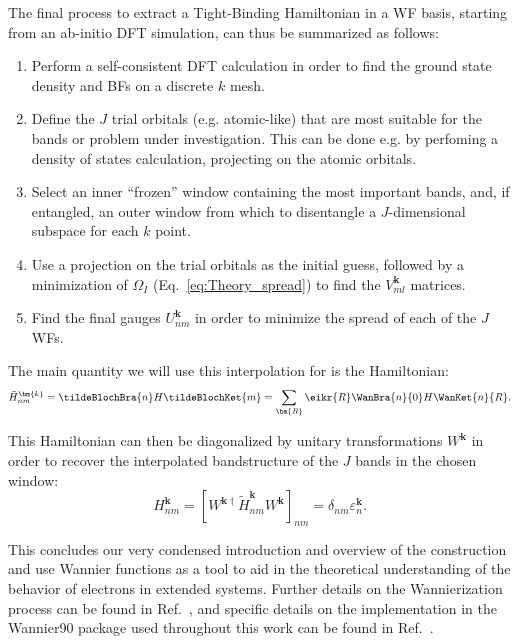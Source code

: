 The final process to extract a Tight-Binding Hamiltonian in a WF basis, starting from an ab-initio DFT simulation, can thus be summarized as follows:
\begin{enumerate}
	\item Perform a self-consistent DFT calculation in order to find the ground state density and BFs on a discrete $k$ mesh.
	\item Define the $J$ trial orbitals (e.g. atomic-like) that are most suitable for the bands or problem under investigation. This can be done e.g. by perfoming a density of states calculation, projecting on the atomic orbitals.
	\item Select an inner ``frozen'' window containing the most important bands, and, if entangled, an outer window from which to disentangle a $J$-dimensional subspace for each $k$ point.
	\item Use a projection on the trial orbitals as the initial guess, followed by a minimization of $\Omega_I$ (Eq.~\eqref{eq:Theory_spread}) to find the $V_{ml}^{\bm{k}}$ matrices.
	\item Find the final gauges $U_{nm}^{\bm{k}}$ in order to minimize the spread of each of the $J$ WFs.
\end{enumerate}

The main quantity we will use this interpolation for is the Hamiltonian:
\begin{equation}
	\label{eq:Theory_waninterp}
	\tilde{H}_{nm}^{\bm{k}} = \tildeBlochBra{n} H \tildeBlochKet{m} = \sum_{\bm{R}} \eikr{R} \WanBra{n}{0}H\WanKet{n}{R}.
\end{equation}

This Hamiltonian can then be diagonalized by unitary transformations $W^{\bm{k}}$ in order to recover the interpolated bandstructure of the $J$ bands in the chosen window:
\begin{equation}
H_{nm}^{\bm{k}} = [W^{\bm{k}\dagger} \tilde{H}_{nm}^{\bm{k}} W^{\bm{k}}]_{nm} = \delta_{nm} \varepsilon_{n}^{\bm{k}}.
\end{equation}

This concludes our very condensed introduction and overview of the construction and use Wannier functions as a tool to aid in the theoretical understanding of the behavior of electrons in extended systems.
Further details on the Wannierization process can be found in Ref.~\cite{Marzari2012}, and specific details on the implementation in the Wannier90 package used throughout this work can be found in Ref.~\cite{Mostofi2014AnFunctions}.

